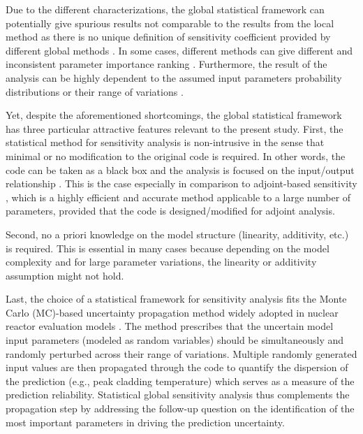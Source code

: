 Due to the different characterizations, the global statistical framework can potentially give spurious results not comparable to the results from the local method as there is no unique definition of sensitivity coefficient provided by different global methods \cite{Razavi2015}. 
In some cases, different methods can give different and inconsistent parameter importance ranking \cite{Saltelli2008,Saltelli2004}.
Furthermore, the result of the analysis can be highly dependent to the assumed input parameters probability distributions or their range of variations \cite{Cacuci2004,Cacuci2010}.

Yet, despite the aforementioned shortcomings, 
the global statistical framework has three particular attractive features relevant to the present study. 
First, the statistical method for sensitivity analysis is non-intrusive in the sense that minimal or no modification to the original code is required. 
In other words, the code can be taken as a black box and the analysis is focused on the input/output relationship \cite{Saltelli2008}. 
This is the case especially in comparison to adjoint-based sensitivity \cite{Cacuci2000,Ionescu-Bujor2000}, which is a highly efficient and accurate method applicable to a large number of parameters, 
provided that the code is designed/modified for adjoint analysis.

Second, no a priori knowledge on the model structure (linearity, additivity, etc.) is required. 
This is essential in many cases because depending on the model complexity and for large parameter variations, the linearity or additivity assumption might not hold.

Last, 
the choice of a statistical framework for sensitivity analysis fits the Monte Carlo (MC)-based uncertainty propagation method widely adopted in nuclear reactor evaluation models \cite{Boyack1990, Nutt2004, Wallis2007, Glaeser2008}. 
The method prescribes that the uncertain model input parameters (modeled as random variables) 
should be simultaneously and randomly perturbed across their range of variations. 
Multiple randomly generated input values are then propagated through the code to quantify the dispersion of the prediction (e.g., peak cladding temperature) 
which serves as a measure of the prediction reliability. 
Statistical global sensitivity analysis thus complements the propagation step 
by addressing the follow-up question on the identification of the most important parameters in driving the prediction uncertainty. 

